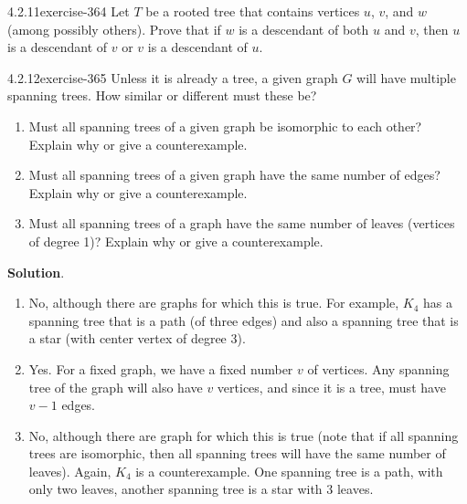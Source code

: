 \documentclass[twoside,11pt,]{book}
\numberwithin{equation}{chapter}
\begin{document}
\begin{divisionsolution}{4.2.11}{}{exercise-364}%
\hypertarget{p-4611}{}%
Let \(T\) be a rooted tree that contains vertices \(u\), \(v\), and \(w\) (among possibly others). Prove that if \(w\) is a descendant of both \(u\) and \(v\), then \(u\) is a descendant of \(v\) or \(v\) is a descendant of \(u\).%
\end{divisionsolution}%
\begin{divisionsolution}{4.2.12}{}{exercise-365}%
\hypertarget{p-4612}{}%
Unless it is already a tree, a given graph \(G\) will have multiple spanning trees. How similar or different must these be?\leavevmode%
\begin{enumerate}[label=(\alph*)]
\item\hypertarget{li-2286}{}\hypertarget{p-4613}{}%
Must all spanning trees of a given graph be isomorphic to each other? Explain why or give a counterexample.%
\item\hypertarget{li-2287}{}\hypertarget{p-4614}{}%
Must all spanning trees of a given graph have the same number of edges? Explain why or give a counterexample.%
\item\hypertarget{li-2288}{}\hypertarget{p-4615}{}%
Must all spanning trees of a graph have the same number of leaves (vertices of degree 1)? Explain why or give a counterexample.%
\end{enumerate}
%
\par\smallskip%
\noindent\textbf{Solution}.\quad%
\hypertarget{p-4616}{}%
\leavevmode%
\begin{enumerate}[label=(\alph*)]
\item\hypertarget{li-2289}{}\hypertarget{p-4617}{}%
No, although there are graphs for which this is true. For example, \(K_4\) has a spanning tree that is a path (of three edges) and also a spanning tree that is a star (with center vertex of degree 3).%
\item\hypertarget{li-2290}{}\hypertarget{p-4618}{}%
Yes. For a fixed graph, we have a fixed number \(v\) of vertices. Any spanning tree of the graph will also have \(v\) vertices, and since it is a tree, must have \(v-1\) edges.%
\item\hypertarget{li-2291}{}\hypertarget{p-4619}{}%
No, although there are graph for which this is true (note that if all spanning trees are isomorphic, then all spanning trees will have the same number of leaves). Again, \(K_4\) is a counterexample. One spanning tree is a path, with only two leaves, another spanning tree is a star with 3 leaves.%
\end{enumerate}
%
\end{divisionsolution}%
\end{document}
